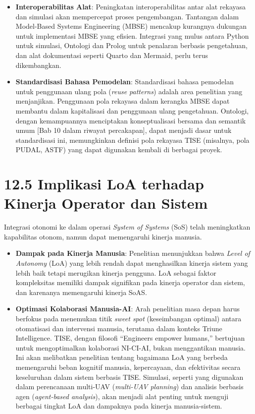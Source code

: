 \documentclass[
  letterpaper,
  DIV=11,
  numbers=noendperiod]{scrreprt}
\providecommand{\tightlist}{%
  \setlength{\itemsep}{0pt}\setlength{\parskip}{0pt}}
\begin{document}
\begin{itemize}
\tightlist
\item
  \textbf{Interoperabilitas Alat}: Peningkatan interoperabilitas antar
  alat rekayasa dan simulasi akan mempercepat proses pengembangan.
  Tantangan dalam Model-Based Systems Engineering (MBSE) mencakup
  kurangnya dukungan untuk implementasi MBSE yang efisien. Integrasi
  yang mulus antara Python untuk simulasi, Ontologi dan Prolog untuk
  penalaran berbasis pengetahuan, dan alat dokumentasi seperti Quarto
  dan Mermaid, perlu terus dikembangkan.
\item
  \textbf{Standardisasi Bahasa Pemodelan}: Standardisasi bahasa
  pemodelan untuk penggunaan ulang pola (\emph{reuse patterns}) adalah
  area penelitian yang menjanjikan. Penggunaan pola rekayasa dalam
  kerangka MBSE dapat membantu dalam kapitalisasi dan penggunaan ulang
  pengetahuan. Ontologi, dengan kemampuannya menciptakan konseptualisasi
  bersama dan semantik umum {[}Bab 10 dalam riwayat percakapan{]}, dapat
  menjadi dasar untuk standardisasi ini, memungkinkan definisi pola
  rekayasa TISE (misalnya, pola PUDAL, ASTF) yang dapat digunakan
  kembali di berbagai proyek.
\end{itemize}

\section{\texorpdfstring{\textbf{12.5 Implikasi LoA terhadap Kinerja
Operator dan
Sistem}}{12.5 Implikasi LoA terhadap Kinerja Operator dan Sistem}}\label{implikasi-loa-terhadap-kinerja-operator-dan-sistem}

Integrasi otonomi ke dalam operasi \emph{System of Systems} (SoS) telah
meningkatkan kapabilitas otonom, namun dapat memengaruhi kinerja
manusia.

\begin{itemize}
\tightlist
\item
  \textbf{Dampak pada Kinerja Manusia}: Penelitian menunjukkan bahwa
  \emph{Level of Autonomy} (LoA) yang lebih rendah dapat menghasilkan
  kinerja sistem yang lebih baik tetapi merugikan kinerja pengguna. LoA
  sebagai faktor kompleksitas memiliki dampak signifikan pada kinerja
  operator dan sistem, dan karenanya memengaruhi kinerja SoAS.
\item
  \textbf{Optimasi Kolaborasi Manusia-AI}: Arah penelitian masa depan
  harus berfokus pada menemukan titik \emph{sweet spot} (keseimbangan
  optimal) antara otomatisasi dan intervensi manusia, terutama dalam
  konteks Triune Intelligence. TISE, dengan filosofi ``Engineers empower
  humans,'' bertujuan untuk mengoptimalkan kolaborasi NI-CI-AI, bukan
  menggantikan manusia. Ini akan melibatkan penelitian tentang bagaimana
  LoA yang berbeda memengaruhi beban kognitif manusia, kepercayaan, dan
  efektivitas secara keseluruhan dalam sistem berbasis TISE. Simulasi,
  seperti yang digunakan dalam perencanaan multi-UAV (\emph{multi-UAV
  planning}) dan analisis berbasis agen (\emph{agent-based analysis}),
  akan menjadi alat penting untuk menguji berbagai tingkat LoA dan
  dampaknya pada kinerja manusia-sistem.
\end{itemize}
\end{document}
